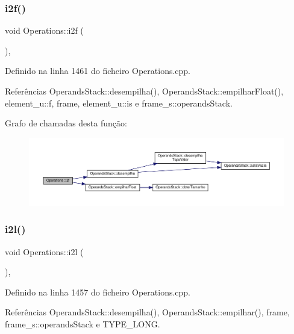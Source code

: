 \subsubsection{\texorpdfstring{i2f()}{i2f()}}
{\footnotesize\ttfamily void Operations\+::i2f (\begin{DoxyParamCaption}{ }\end{DoxyParamCaption})\hspace{0.3cm}{\ttfamily [static]}, {\ttfamily [private]}}



Definido na linha 1461 do ficheiro Operations.\+cpp.



Referências Operands\+Stack\+::desempilha(), Operands\+Stack\+::empilhar\+Float(), element\+\_\+u\+::f, frame, element\+\_\+u\+::is e frame\+\_\+s\+::operands\+Stack.

Grafo de chamadas desta função\+:
\nopagebreak
\begin{figure}[H]
\begin{center}
\leavevmode
\includegraphics[width=350pt]{classOperations_a4880878630a620c325840fc7980dc131_cgraph}
\end{center}
\end{figure}
\mbox{\label{classOperations_ae5d28665a74411cbb880e3007c5405e8}} 
\subsubsection{\texorpdfstring{i2l()}{i2l()}}
{\footnotesize\ttfamily void Operations\+::i2l (\begin{DoxyParamCaption}{ }\end{DoxyParamCaption})\hspace{0.3cm}{\ttfamily [static]}, {\ttfamily [private]}}



Definido na linha 1457 do ficheiro Operations.\+cpp.



Referências Operands\+Stack\+::desempilha(), Operands\+Stack\+::empilhar(), frame, frame\+\_\+s\+::operands\+Stack e T\+Y\+P\+E\+\_\+\+L\+O\+NG.

